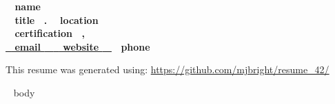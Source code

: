 \documentclass[11pt,english]{article}
\begin{document}

\begin{center}
\huge\bf\color{maincolor} ~{{ name }}~  \\
\small\color{black} ~{{ title }}~.
\small\color{black} ~{{ location }}~ \\
\small\color{black} ~{{ certification }}~, \\
\small\color{black} \href{mailto: ~{{ email }}~ }{ ~{{ email }}~ } 
\small\color{black} \href{ ~{{ website }}~ }{ ~{{ website }}~ } 
\small\color{black} ~{{ phone }}~

\end{center}

\begin{flushright}
\vspace{3.5mm}
\tiny This resume was generated using: \url{https://github.com/mjbright/resume\_42/}
\end{flushright}

\vspace{-18mm}

~{{ body }}~
\end{document}
